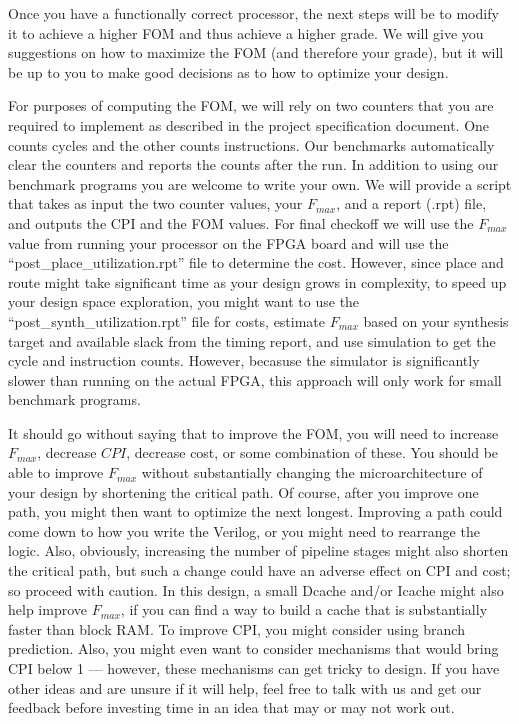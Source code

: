 Once you have a functionally correct processor, the next steps will be to modify it to achieve a higher FOM and thus achieve a higher grade.
We will give you suggestions on how to maximize the FOM (and therefore your grade),
but it will be up to you to make good decisions as to how to optimize your design.

For purposes of computing the FOM, we will rely on two counters that you are required to implement as described in the project specification document.
One counts cycles and the other counts instructions.
Our benchmarks automatically clear the counters and reports the counts after the run.  In addition to using our benchmark programs you are welcome to write your own.
We will provide a script that takes as input the two counter values, your $F_{max}$, and a report (.rpt) file, and outputs the CPI and the FOM values.
For final checkoff we will use the $F_{max}$ value from running your processor on the FPGA board and will use the ``post\_place\_utilization.rpt'' file to determine the cost.
However, since place and route might take significant time as your design grows in complexity, to speed up your design space exploration, you might want
to use the ``post\_synth\_utilization.rpt'' file for costs, estimate $F_{max}$ based on your synthesis target and available slack from the timing report, and use simulation to get the cycle and instruction counts.  However, becasuse the simulator is significantly slower than running on the actual FPGA, this approach will only work for small benchmark programs.


It should go without saying that to improve the FOM, you will need to increase $F_{max}$, decrease $CPI$, decrease cost, or some combination of these.
You should be able to improve $F_{max}$ without substantially changing the microarchitecture of your design
by shortening the critical path.
Of course, after you improve one path, you might then want to optimize the next longest.
Improving a path could come down to how you write the Verilog, or you might need to rearrange the logic.
Also, obviously, increasing the number of pipeline stages might also shorten the critical path, but such a change could have an adverse effect on CPI and cost; so proceed with caution.
In this design, a small Dcache and/or Icache might also help improve $F_{max}$, if you can find a way to build a cache that is substantially faster than block RAM.
To improve CPI, you might consider using branch prediction.
Also, you might even want to consider mechanisms that would bring CPI below 1 --- however, these mechanisms can get tricky to design.
If you have other ideas and are unsure if it will help, feel free to talk with us and get our feedback before investing time in an idea that may or may not work out.

